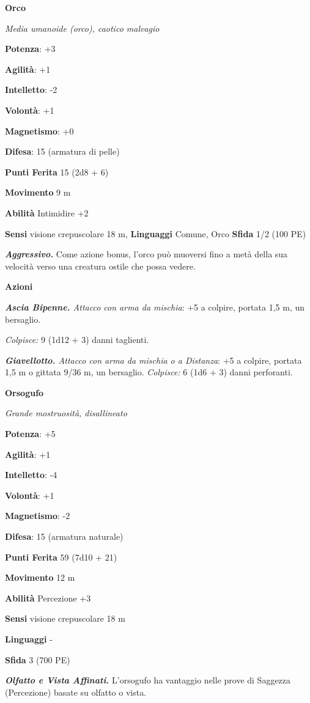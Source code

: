 \begin{multicols}{2}
\textbf{Orco}

\emph{Media umanoide (orco), caotico malvagio}

\textbf{Potenza}: +3

\textbf{Agilità}: +1

\textbf{Intelletto}: -2

\textbf{Volontà}: +1

\textbf{Magnetismo}: +0

\textbf{Difesa}: 15 (armatura di pelle)

\textbf{Punti Ferita} 15 (2d8 + 6)

\textbf{Movimento} 9 m

\textbf{Abilità} Intimidire +2

\textbf{Sensi} visione crepuscolare 18 m, 
\textbf{Linguaggi} Comune, Orco \textbf{Sfida} 1/2 (100 PE)

\emph{\textbf{Aggressivo.}} Come azione bonus, l'orco può muoversi fino
a metà della sua velocità verso una creatura ostile che possa vedere.

\textbf{Azioni}

\emph{\textbf{Ascia Bipenne.} Attacco con arma da mischia}: +5 a
colpire, portata 1,5 m, un bersaglio.

\emph{Colpisce:} 9 (1d12 + 3) danni taglienti.

\emph{\textbf{Giavellotto.} Attacco con arma da mischia o a Distanza}:
+5 a colpire, portata 1,5 m o gittata 9/36 m, un bersaglio.
\emph{Colpisce:} 6 (1d6 + 3) danni perforanti.

\textbf{Orsogufo}

\emph{Grande mostruosità, disallineato}

\textbf{Potenza}: +5

\textbf{Agilità}: +1

\textbf{Intelletto}: -4

\textbf{Volontà}: +1

\textbf{Magnetismo}: -2

\textbf{Difesa}: 15 (armatura naturale)

\textbf{Punti Ferita} 59 (7d10 + 21)

\textbf{Movimento} 12 m

\textbf{Abilità} Percezione +3

\textbf{Sensi} visione crepuscolare 18 m

\textbf{Linguaggi} -

\textbf{Sfida} 3 (700 PE)

\emph{\textbf{Olfatto e Vista Affinati.}} L'orsogufo ha vantaggio nelle
prove di Saggezza (Percezione) basate su olfatto o vista.


\end{multicols}
